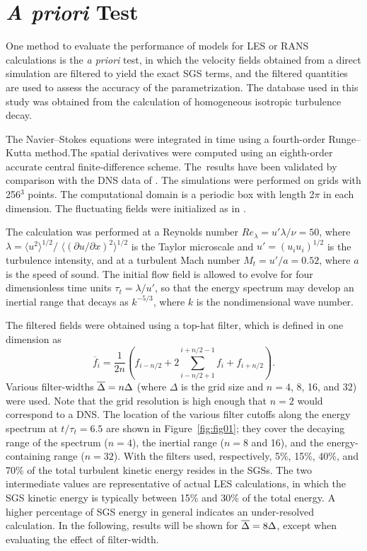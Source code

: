 \documentclass[tcfd]{svjour}
\begin{document}

\section{{\em A priori} Test}
\label{sec:3}

One method to evaluate the performance of models for LES or RANS
calculations is the {\it a priori} test, in which the velocity
f\/ields obtained from a direct simulation are f\/iltered to yield the
exact SGS terms, and the f\/iltered quantities are used to assess the
accuracy of the parametrization. The database used in this study was
obtained from the calculation of homogeneous isotropic turbulence
decay.

The Navier--Stokes equations were integrated in time using a
fourth-order Runge--Kutta method.\break The spatial derivatives were
computed using an eighth-order accurate central f\/inite-difference
scheme. The\pagebreak\ results have been validated by comparison with the
DNS data of \citet[1999]{mar98}. The simulations were performed
on grids with 256$^3$ points. The computational domain is a periodic
box with length 2$\pi$ in each dimension. The f\/luctuating f\/ields were
initialized as in \citet{ris97}.

The calculation was performed at a Reynolds number
$Re_{\lambda}=u'\lambda/\nu=50$, where
$\lambda=\langle u^2\rangle^{1/2}/$\break
$\langle{(\partial u/\partial x)^2}\rangle^{1/2}$ is the Taylor
microscale and $u'=(u_iu_i)^{1/2}$ is the turbulence intensity, and
at a turbulent Mach number $M_t=u'/a=0.52$, where $a$ is the speed
of sound. The initial f\/low f\/ield is allowed to evolve for four
dimensionless time units $\tau_t=\lambda/u'$, so that the energy
spectrum may develop an inertial range that decays as $k^{-5/3}$,
where $k$ is the nondimensional wave number.

The f\/iltered f\/ields were obtained using a top-hat f\/ilter, which is
def\/ined in one dimension as
\begin{equation}
 \label{eq:tophat}
 \overline{f}_i = \frac{1}{2n}
 \left( f_{i-{n}/{2}}+2\sum_{i-{n}/{2}+1}^{i+{n}/{2}-1}f_{i}+f_{i+{n}/{2}}\right) .
\end{equation}
Various f\/ilter-widths $\overline{\Delta}=n\Delta$ (where $\Delta$ is the grid
size and $n=4$, 8, 16, and 32) were used. Note that the grid
resolution is high enough that $n=2$ would correspond to a DNS. The
location of the various f\/ilter cutoffs along the energy spectrum at
$t/\tau_t=6.5$ are shown in Figure~\ref{fig:fig01}; they cover the decaying range of
the spectrum ($n=4$), the inertial range ($n=8$ and 16), and the
energy-containing range ($n=32$). With the f\/ilters used,
respectively, 5\%, 15\%, 40\%, and 70\% of the total turbulent kinetic
energy resides in the SGSs. The two intermediate values are
representative of actual LES calculations, in which the SGS kinetic energy\break
is typically between 15\% and 30\% of the total energy. A higher
percentage of SGS energy in general indicates an under-resolved
calculation. In the following, results will be shown for
$\overline{\Delta}=8\Delta$, except when evaluating the effect of f\/ilter-width.
\end{document}
